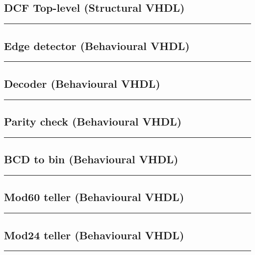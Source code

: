 \documentclass[a4paper, twoside, 10pt]{article}
\begin{document}
\newpage
\subsection{DCF Top-level (Structural VHDL)}
\label{lst: toplevel}

\hrule


\newpage
\subsection{Edge detector (Behavioural VHDL)}
\label{lst: edgedetector}

\hrule


\newpage
\subsection{Decoder (Behavioural VHDL)}
\label{lst: decoder}

\hrule


\newpage
\subsection{Parity check (Behavioural VHDL)}
\label{lst: paritycheck}

\hrule


\newpage
\subsection{BCD to bin (Behavioural VHDL)}
\label{lst: bcd2bin}

\hrule


\newpage
\subsection{Mod60 teller (Behavioural VHDL)}
\label{lst: mod60teller}

\hrule


\newpage
\subsection{Mod24 teller (Behavioural VHDL)}
\label{lst: mod24teller}

\hrule

\end{document}

